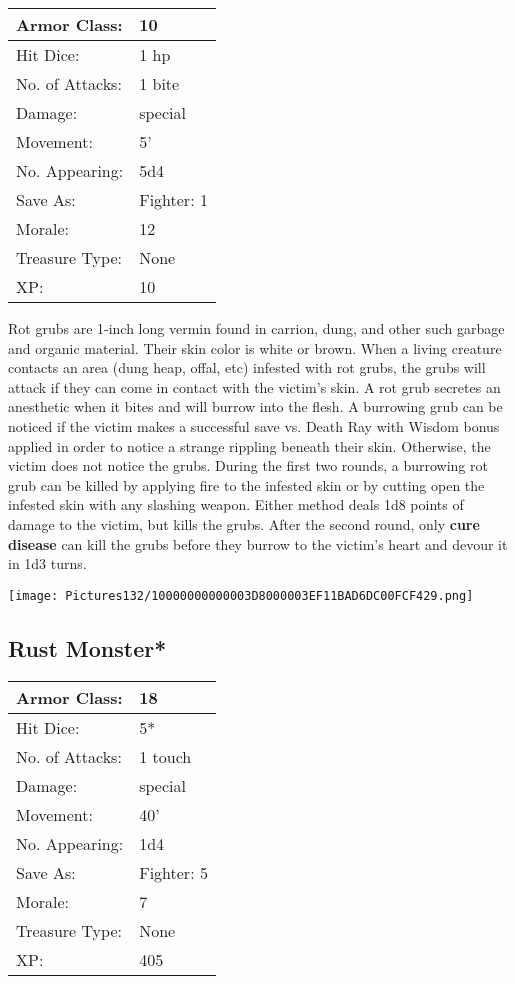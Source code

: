 \documentclass[a4paper,twoside,openany,10pt]{book}
\begin{document}
\begin{multicols}{2}
\begin{tabularx}{0.50\textwidth}{@{}lX@{}}
Armor Class: & 10 \\\hline
Hit Dice: & 1 hp \\\hline
No. of Attacks: & 1 bite \\\hline
Damage: & special \\\hline
Movement: & 5' \\\hline
No. Appearing: & 5d4 \\\hline
Save As: & Fighter: 1 \\\hline
Morale: & 12 \\\hline
Treasure Type: & None \\\hline
XP: & 10 \\\hline
\end{tabularx}\medskip

Rot grubs are 1-inch long vermin found in carrion, dung, and other such garbage and organic material. Their skin color is white or brown. When a living creature contacts an area (dung heap, offal, etc) infested with rot grubs, the grubs will attack if they can come in contact with the victim's skin. A rot grub secretes an anesthetic when it bites and will burrow into the flesh. A burrowing grub can be noticed if the victim makes a successful save vs. Death Ray with Wisdom bonus applied in order to notice a strange rippling beneath their skin. Otherwise, the victim does not notice the grubs. During the first two rounds, a burrowing rot grub can be killed by applying fire to the infested skin or by cutting open the infested skin with any slashing weapon. Either method deals 1d8 points of damage to the victim, but kills the grubs. After the second round, only \textbf{cure disease} can kill the grubs before they burrow to the victim's heart and devour it in 1d3 turns.

\begin{center} \texttt{[image: Pictures132/10000000000003D8000003EF11BAD6DC00FCF429.png]} \end{center}


\subsection*{Rust Monster*}\label{rust-monster}

\begin{tabularx}{0.50\textwidth}{@{}lX@{}}
Armor Class: & 18 \\\hline
Hit Dice: & 5* \\\hline
No. of Attacks: & 1 touch \\\hline
Damage: & special \\\hline
Movement: & 40' \\\hline
No. Appearing: & 1d4 \\\hline
Save As: & Fighter: 5 \\\hline
Morale: & 7 \\\hline
Treasure Type: & None \\\hline
XP: & 405 \\\hline
\end{tabularx}\medskip


\end{multicols}
\end{document}
